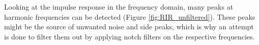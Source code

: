Looking at the impulse response in the frequency domain, many peaks at harmonic frequencies can be detected (Figure \ref{fig:RIR_unfiltered}). These peaks might be the source of unwanted noise and side peaks, which is why an attempt is done to filter them out by applying notch filters on the respective frequencies.


